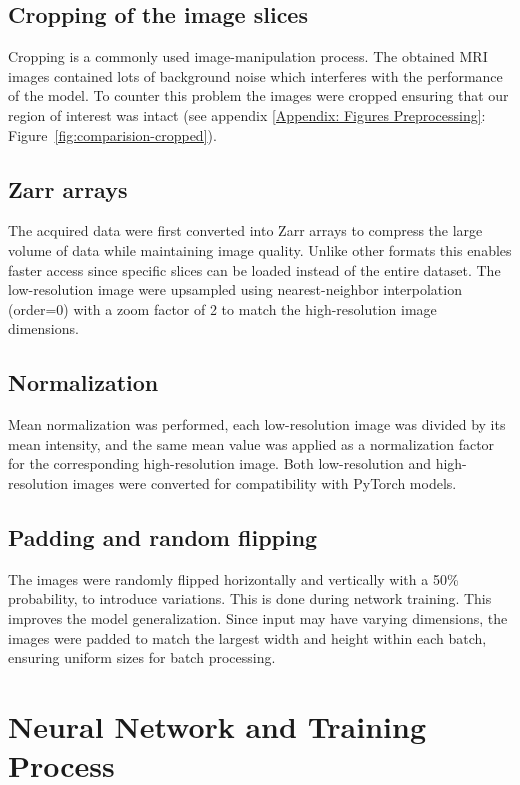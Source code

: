 \documentclass[twocolumn]{article}
\begin{document}
\subsection{Cropping of the image slices}

Cropping is a commonly used image-manipulation process. The obtained MRI images contained lots of background noise which interferes with the performance of the model. 
To counter this problem the images were cropped ensuring that our region of interest was intact (see appendix \ref{Appendix: Figures Preprocessing}: Figure~\ref{fig:comparision-cropped}).  

\subsection{Zarr arrays}

The acquired data were first converted into Zarr arrays to compress the large volume of data while maintaining image quality. 
Unlike other formats this enables faster access since specific slices can be loaded instead of the entire dataset.
The low-resolution image were upsampled using nearest-neighbor interpolation (order=0) with a zoom factor of 2 to match the high-resolution image dimensions. 

\subsection{Normalization}

Mean normalization was performed, each low-resolution image was divided by its mean intensity, and the same mean value was applied as a normalization factor for the corresponding high-resolution image.  
Both low-resolution and high-resolution images were converted for compatibility with PyTorch models.

\subsection{Padding and random flipping}
The images were randomly flipped horizontally and vertically with a 50\% probability, to introduce variations.
This is done during network training. 
This improves the model generalization. Since input may have varying dimensions, the images were padded to match the largest width and height within each batch, ensuring uniform sizes for batch processing.


\section{Neural Network and Training Process}
\end{document}
